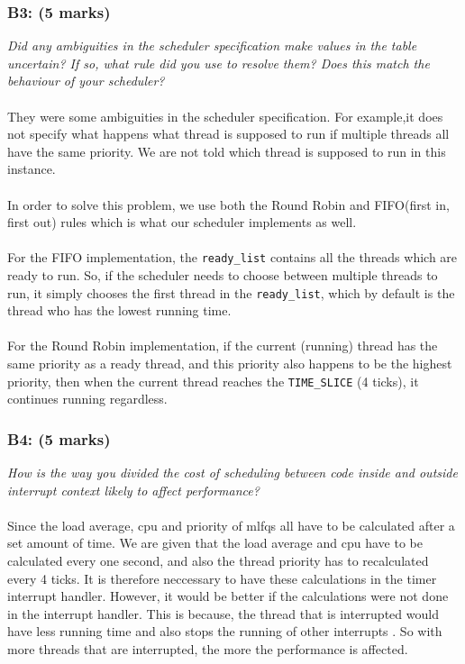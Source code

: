 \documentclass{article}
\begin{document}
\subsubsection*{B3: (5 marks) }
\textit{Did any ambiguities in the scheduler specification make values in the table uncertain?  If so, what rule did you use to resolve them?  Does this match the behaviour of your scheduler?}
\\ \\
They were some ambiguities in the scheduler specification. For example,it does not specify what happens what thread is supposed to run if multiple threads all have the same priority. We are not told which thread is supposed to run in this instance.
  \\\\
In order to solve this problem, we use both the Round Robin and FIFO(first in, first out) rules which is what our scheduler implements as well.
  \\\\
For the FIFO implementation, the \texttt{ready\_list} contains all the threads which are ready to run. So, if the scheduler needs to choose between multiple threads to run, it simply chooses the first thread in the \texttt{ready\_list}, which by default is the thread who has the lowest running time.
  \\\\
For the Round Robin implementation, if the current (running) thread has the same priority as a ready thread, and this priority also happens to be the highest priority, then when the current thread reaches the \texttt{TIME\_SLICE} (4 ticks), it continues running regardless.

\subsubsection*{B4: (5 marks) }
\textit{How is the way you divided the cost of scheduling between code inside and outside interrupt context likely to affect performance?}
\\ \\
Since the load average, cpu and priority of mlfqs all have to be calculated after a set amount of time. We are given that the load average and cpu have to be calculated every one second, and also the thread priority has to recalculated every 4 ticks. It is therefore neccessary to have these calculations in the timer interrupt handler. However, it would be better if the calculations were not done in the interrupt handler. This is because, the thread that is interrupted would have less running time and also stops the running of other interrupts . So with more threads that are interrupted, the more the performance is affected.
\end{document}

